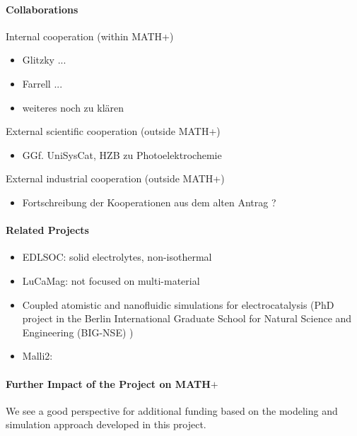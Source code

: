 \documentclass[a4paper,10pt]{article}
\begin{document}
\paragraph{Collaborations}

Internal cooperation (within MATH+)
\begin{itemize}
\item Glitzky ...
\item Farrell ...
\item weiteres noch zu klären
\end{itemize}

External scientific cooperation (outside MATH+)
\begin{itemize}
\item GGf. UniSysCat, HZB zu Photoelektrochemie
\end{itemize}

External industrial cooperation (outside MATH+)
\begin{itemize}
\item Fortschreibung der Kooperationen aus dem alten Antrag ?
\end{itemize}

\paragraph{Related Projects}
\begin{itemize}
\item EDLSOC: solid electrolytes, non-isothermal
\item LuCaMag: not focused on multi-material
\item Coupled atomistic and nanofluidic simulations for electrocatalysis (PhD project
  in the  Berlin International Graduate School for Natural Science and Engineering (BIG-NSE) )
\item Malli2:
\end{itemize}

\paragraph{Further Impact of the Project on MATH$+$}
We see a good perspective for additional funding based on the modeling and simulation approach
developed in this project.
\end{document}

